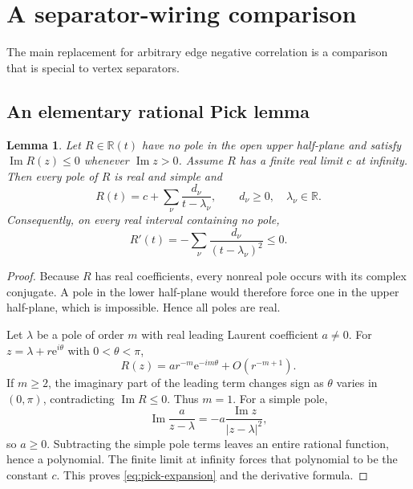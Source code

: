 \documentclass[11pt]{article}
\newtheorem{lemma}[theorem]{Lemma}
\theoremstyle{definition}
\theoremstyle{remark}
\newcommand{\1}{\mathbf 1}
\newcommand{\e}{\mathrm e}
\begin{document}
\section{A separator-wiring comparison}\label{sec:separator}

The main replacement for arbitrary edge negative correlation is a comparison that is
special to vertex separators.

\subsection{An elementary rational Pick lemma}

\begin{lemma}\label{lem:rational-pick}
Let $R\in\mathbb R(t)$ have no pole in the open upper half-plane and satisfy
$\operatorname{Im}R(z)\le0$ whenever $\operatorname{Im}z>0$.  Assume $R$ has a finite
real limit $c$ at infinity.  Then every pole of $R$ is real and simple and
\begin{equation}\label{eq:pick-expansion}
 R(t)=c+\sum_{\nu}\frac{d_\nu}{t-\lambda_\nu},
 \qquad d_\nu\ge0,\quad \lambda_\nu\in\mathbb R.
\end{equation}
Consequently, on every real interval containing no pole,
\begin{equation}
 R'(t)=-\sum_\nu\frac{d_\nu}{(t-\lambda_\nu)^2}\le0.
\end{equation}
\end{lemma}

\begin{proof}
Because $R$ has real coefficients, every nonreal pole occurs with its complex
conjugate.  A pole in the lower half-plane would therefore force one in the upper
half-plane, which is impossible.  Hence all poles are real.

Let $\lambda$ be a pole of order $m$ with real leading Laurent coefficient $a\neq0$.
For $z=\lambda+r\e^{i\theta}$ with $0<\theta<\pi$,
\begin{equation}
 R(z)=a r^{-m}\e^{-im\theta}+O(r^{-m+1}).
\end{equation}
If $m\ge2$, the imaginary part of the leading term changes sign as $\theta$ varies in
$(0,\pi)$, contradicting $\operatorname{Im}R\le0$.  Thus $m=1$.  For a simple pole,
\begin{equation}
 \operatorname{Im}\frac{a}{z-\lambda}
 =-a\frac{\operatorname{Im}z}{|z-\lambda|^2},
\end{equation}
so $a\ge0$.  Subtracting the simple pole terms leaves an entire rational function,
hence a polynomial.  The finite limit at infinity forces that polynomial to be the
constant $c$.  This proves \eqref{eq:pick-expansion} and the derivative formula.
\end{proof}
\end{document}
